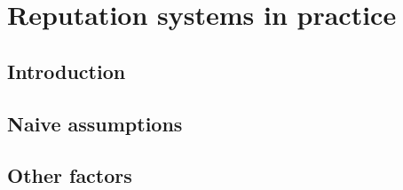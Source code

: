 \chapter{Reputation systems in practice}
\section{Introduction}

\section{Naive assumptions}

\section{Other factors}
